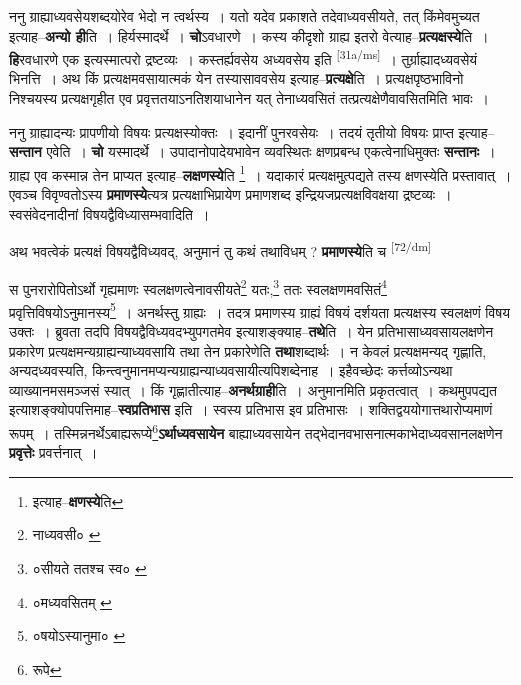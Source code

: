 \documentclass[article,12pt,a4paper]{memoir}
\begin{document}
	  \pstart ननु ग्राह्याध्यवसेयशब्दयोरेव भेदो न त्वर्थस्य । यतो यदेव प्रकाशते तदेवाध्यवसीयते, तत् किंमेवमुच्यत इत्याह--\textbf{अन्यो ही}ति । हिर्यस्मादर्थे । \textbf{चो}ऽवधारणे । कस्य कीदृशो ग्राह्य इतरो वेत्याह--\textbf{प्रत्यक्षस्ये}ति । \textbf{हि}रवधारणे एक इत्यस्मात्परो द्रष्टव्यः । कस्तर्ह्यवसेय अध्यवसेय इति \leavevmode\textsuperscript{\rmlatinfont\tiny [31a/ms]} । तुर्ग्राह्यादध्यवसेयं भिनत्ति । अथ किं प्रत्यक्षमवसायात्मकं येन तस्यासाववसेय इत्याह--\textbf{प्रत्यक्षे}ति । प्रत्यक्षपृष्ठभाविनो निश्चयस्य प्रत्यक्षगृहीत एव प्रवृत्ततयाऽनतिशयाधानेन यत् तेनाध्यवसितं तत्प्रत्यक्षेणैवावसितमिति भावः ।
	\pend
      

	  \pstart ननु ग्राह्यादन्यः प्रापणीयो विषयः प्रत्यक्षस्योक्तः । इदानीं पुनरवसेयः । तदयं तृतीयो विषयः प्राप्त इत्याह--\textbf{सन्तान} एवेति । \textbf{चो} यस्मादर्थे । उपादानोपादेयभावेन व्यवस्थितः क्षणप्रबन्ध एकत्वेनाधिमुक्तः \textbf{सन्तानः} । ग्राह्य एव कस्मान्न तेन प्राप्यत इत्याह--\textbf{लक्षणस्ये}ति \footnote{इत्याह--\textbf{क्षणस्ये}ति} । यदाकारं प्रत्यक्षमुत्पद्यते तस्य क्षणस्येति प्रस्तावात् । एवञ्च विवृण्वतोऽस्य \textbf{प्रमाणस्ये}त्यत्र प्रत्यक्षाभिप्रायेण प्रमाणशब्द इन्द्रियजप्रत्यक्षविवक्षया द्रष्टव्यः । स्वसंवेदनादीनां विषयद्वैविध्यासम्भवादिति ।
	\pend
      

	  \pstart अथ भवत्वेकं प्रत्यक्षं विषयद्वैविध्यवद्, अनुमानं तु कथं तथाविधम् ? \textbf{प्रमाणस्ये}ति च  \leavevmode\textsuperscript{\rmlatinfont\tiny [72/dm]} 
	  
	स पुनरारोपितोऽर्थो गृह्यमाणः स्वलक्षणत्वेनावसीयते\footnote{नाध्यवसी० \cite{dp-msC} \cite{dp-msD} \cite{dp-edN}} यतः,\footnote{०सीयते ततश्च स्व० \cite{dp-msD}} ततः स्वलक्षणमवसितं\footnote{०मध्यवसितम् \cite{dp-msA} \cite{dp-msB} \cite{dp-msD} \cite{dp-edP} \cite{dp-edH} \cite{dp-edE} \cite{dp-edN}} प्रवृत्तिविषयोऽनुमानस्य\footnote{०षयोऽस्यानुमा० \cite{dp-msC} \cite{dp-msD}} । अनर्थस्तु ग्राह्यः । तदत्र प्रमाणस्य ग्राह्यं विषयं दर्शयता प्रत्यक्षस्य स्वलक्षणं विषय उक्तः । ब्रुवता तदपि विषयद्वैविध्यवदभ्युपगतमेव इत्याशङ्क्याह--\textbf{तथे}ति । येन प्रतिभासाध्यवसायलक्षणेन प्रकारेण प्रत्यक्षमन्यग्राह्यन्याध्यवसायि तथा तेन प्रकारेणेति \textbf{तथा}शब्दार्थः । न केवलं प्रत्यक्षमन्यद् गृह्णाति, अन्यदध्यवस्यति, किन्त्वनुमानमप्यन्यग्राह्यन्याध्यवसायीत्यपिशब्देनाह । इहैवच्छेदः कर्त्तव्योऽन्यथा व्याख्यानमसमञ्जसं स्यात् । किं गृह्णातीत्याह--\textbf{अनर्थग्राही}ति । अनुमानमिति प्रकृतत्वात् । कथमुपपद्यत इत्याशङ्क्योपपत्तिमाह--\textbf{स्वप्रतिभास} इति । स्वस्य प्रतिभास इव प्रतिभासः । शक्तिद्वययोगात्तथारोप्यमाणं रूपम् । तस्मिन्ननर्थेऽबाह्यरूप्ये\footnote{रूपे}\textbf{ऽर्थाध्यवसायेन} बाह्याध्यवसायेन तद्भेदानवभासनात्मकाभेदाध्यवसानलक्षणेन \textbf{प्रवृत्तेः} प्रवर्त्तनात् ।
	\pend
      
\end{document}
